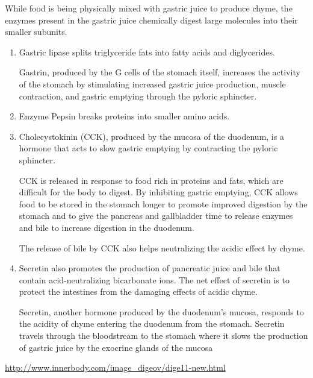 While food is being physically mixed with gastric juice to produce chyme, the
enzymes present in the gastric juice chemically digest large molecules into
their smaller subunits. 

\begin{enumerate}
  \item  Gastric lipase splits triglyceride fats into fatty acids and
  diglycerides. 

Gastrin, produced by the G cells of the stomach itself, increases the activity
of the stomach by stimulating increased gastric juice production, muscle
contraction, and gastric emptying through the pyloric sphincter. 
  
  \item Enzyme Pepsin breaks proteins into smaller amino acids.
  
  \item Cholecystokinin (CCK), produced by the mucosa of the duodenum, is a
  hormone that acts to slow gastric emptying by contracting the pyloric
  sphincter. 
  
  CCK is released in response to food rich in proteins and fats, which are
  difficult for the body to digest. By inhibiting gastric emptying, CCK allows
  food to be stored in the stomach longer to promote improved digestion by the
  stomach and to give the pancreas and gallbladder time to release enzymes and
  bile to increase digestion in the duodenum.
  
  The release of bile by CCK also helps neutralizing the acidic effect by chyme.
  
  \item  Secretin also promotes the production of pancreatic juice and bile that
  contain acid-neutralizing bicarbonate ions. The net effect of secretin is to
  protect the intestines from the damaging effects of acidic chyme. 
  
Secretin, another hormone produced by the duodenum's mucosa, responds to the
acidity of chyme entering the duodenum from the stomach. Secretin travels
through the bloodstream to the stomach where it slows the production of gastric
juice by the exocrine glands of the mucosa  
\end{enumerate}
\url{http://www.innerbody.com/image_digeov/dige11-new.html}
